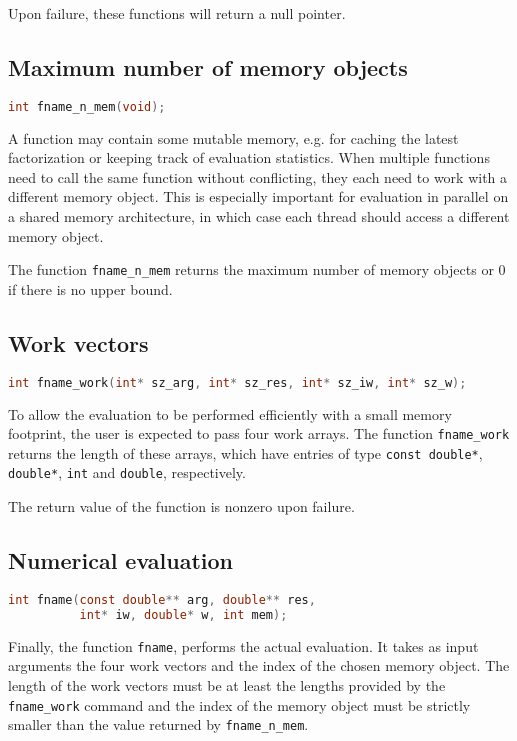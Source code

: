 \documentclass[a4paper,12pt]{book}
\newcommand{\cxx}[1]{\lstinline[language=C++]{#1}}
\begin{document}
Upon failure, these functions will return a null pointer.

\subsection*{Maximum number of memory objects}
\begin{lstlisting}[language=C]
int fname_n_mem(void);
\end{lstlisting}

A function may contain some mutable memory, e.g. for caching the latest
factorization or keeping track of evaluation statistics. When multiple functions
need to call the same function without conflicting, they each need to work with
a different memory object. This is especially important for evaluation in
parallel on a shared memory architecture, in which case each thread should access
a different memory object.

The function \verb|fname_n_mem| returns the maximum number of memory objects
or 0 if there is no upper bound.

\subsection*{Work vectors}
\begin{lstlisting}[language=C]
int fname_work(int* sz_arg, int* sz_res, int* sz_iw, int* sz_w);
\end{lstlisting}

To allow the evaluation to be performed efficiently with a small memory
footprint, the user is expected to pass four work arrays. The function
\verb|fname_work| returns the length of these arrays, which have entries
of type \verb|const double*|, \verb|double*|, \verb|int| and \verb|double|,
respectively.

The return value of the function is nonzero upon failure.

\subsection*{Numerical evaluation}
\begin{lstlisting}[language=C]
int fname(const double** arg, double** res,
          int* iw, double* w, int mem);
\end{lstlisting}

Finally, the function \verb|fname|, performs the actual evaluation. It takes
as input arguments the four work vectors and the index of the chosen memory
object. The length of the work vectors must be at least the lengths provided
by the \cxx{fname_work} command and the index of the memory object must be strictly
smaller than the value returned by \cxx{fname_n_mem}.
\end{document}
